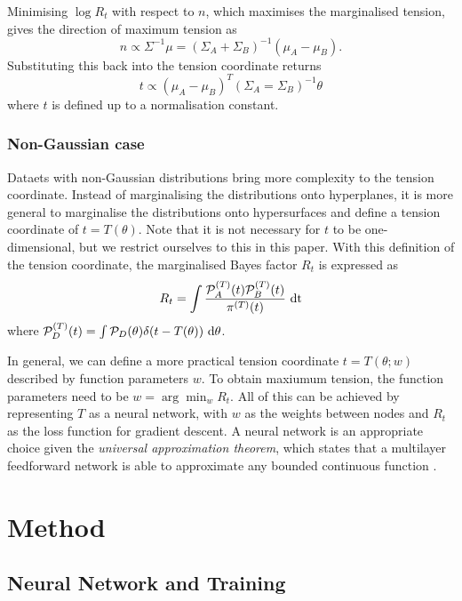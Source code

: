\documentclass[%
 reprint,
 amsmath,amssymb,
 aps,
]{revtex4-2}
\begin{document}
Minimising $\log R_t$ with respect to $n$, which maximises the marginalised tension, gives the direction of maximum tension as
\begin{equation}
    n \propto \Sigma^{-1} \mu = (\Sigma_A + \Sigma_B)^{-1} (\mu_A - \mu_B).
\end{equation}
Substituting this back into the tension coordinate returns
\begin{equation}
    t \propto (\mu_A - \mu_B)^T (\Sigma_A = \Sigma_B)^{-1} \theta
\end{equation}
where $t$ is defined up to a normalisation constant.

\subsubsection{Non-Gaussian case} \label{non_gaussian}

Dataets with non-Gaussian distributions bring more complexity to the tension coordinate. Instead of marginalising the distributions onto hyperplanes, it is more general to marginalise the distributions onto hypersurfaces and define a tension coordinate of $t = T(\theta)$. Note that it is not necessary for $t$ to be one-dimensional, but we restrict ourselves to this in this paper. With this definition of the tension coordinate, the marginalised Bayes factor $R_t$ is expressed as
\begin{equation} \label{margin_R}
    R_t = \int \frac{\mathcal{P}_A^{(T)}(t) \mathcal{P}_B^{(T)}(t)}{\pi^{(T)}(t)} \ \rm{d}t
\end{equation}
where $\mathcal{P}_D^{(T)}(t) = \int \mathcal{P}_D(\theta) \delta(t - T(\theta)) \ \rm{d}\theta$.

In general, we can define a more practical tension coordinate $t = T(\theta; w)$ described by function parameters $w$. To obtain maxiumum tension, the function parameters need to be $w = \arg \min_w R_t$. All of this can be achieved by representing $T$ as a neural network, with $w$ as the weights between nodes and $R_t$ as the loss function for gradient descent. A neural network is an appropriate choice given the \textit{universal approximation theorem}, which states that a multilayer feedforward network is able to approximate any bounded continuous function \cite{Hornik1989}. 


\section{Method}

\subsection{Neural Network and Training}
\end{document}
